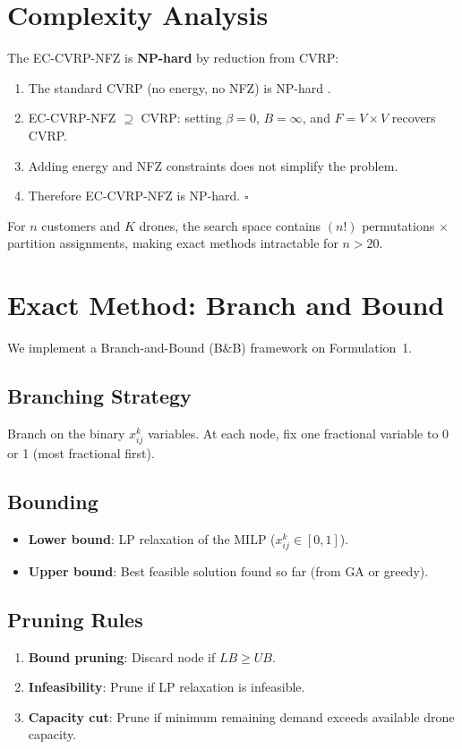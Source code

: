 \documentclass[12pt,a4paper]{article}
\begin{document}
\section{Complexity Analysis}
The EC-CVRP-NFZ is \textbf{NP-hard} by reduction from CVRP:
\begin{enumerate}[nosep]
  \item The standard CVRP (no energy, no NFZ) is NP-hard \cite{toth2014}.
  \item EC-CVRP-NFZ $\supseteq$ CVRP: setting $\beta=0$, $B=\infty$, and $F=V\times V$ recovers CVRP.
  \item Adding energy and NFZ constraints does not simplify the problem.
  \item Therefore EC-CVRP-NFZ is NP-hard. $\square$
\end{enumerate}
For $n$ customers and $K$ drones, the search space contains $(n!)$ permutations $\times$ partition assignments, making exact methods intractable for $n>20$.

\section{Exact Method: Branch and Bound}
We implement a Branch-and-Bound (B\&B) framework on Formulation~1.

\subsection{Branching Strategy}
Branch on the binary $x_{ij}^k$ variables. At each node, fix one fractional variable to 0 or 1 (most fractional first).

\subsection{Bounding}
\begin{itemize}[nosep]
  \item \textbf{Lower bound}: LP relaxation of the MILP ($x_{ij}^k\in[0,1]$).
  \item \textbf{Upper bound}: Best feasible solution found so far (from GA or greedy).
\end{itemize}

\subsection{Pruning Rules}
\begin{enumerate}[nosep]
  \item \textbf{Bound pruning}: Discard node if $LB \geq UB$.
  \item \textbf{Infeasibility}: Prune if LP relaxation is infeasible.
  \item \textbf{Capacity cut}: Prune if minimum remaining demand exceeds available drone capacity.
\end{enumerate}
\end{document}
